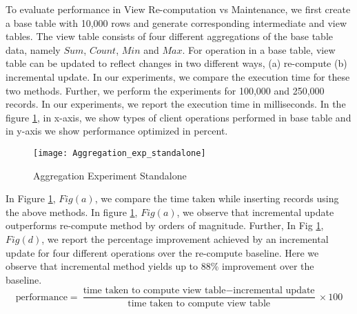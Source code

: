 \documentclass[11pt,a4paper,bibtotoc,idxtotoc,headsepline,footsepline,footexclude,BCOR12mm,DIV13]{scrbook}
\begin{document}
To evaluate performance in View Re-computation vs Maintenance, we first create a base table with 10,000 rows and generate corresponding intermediate and view tables. The view table consists of four different aggregations of the base table data, namely $Sum$, $Count$, $Min$ and $Max$. For operation in a base table, view table can be updated to reflect changes in two different ways, (a) re-compute (b) incremental update. In our experiments, we compare the execution time for these two methods. Further, we perform the experiments for 100,000 and 250,000 records. In our experiments, we report the execution time in milliseconds. In the figure \ref{sec:AggrExpStandalone}, in x-axis, we show types of client operations performed in base table and in y-axis we show performance optimized in percent. 

\begin{figure}
	\centering
	\texttt{[image: Aggregation\_exp\_standalone]}
	\caption{Aggregation Experiment Standalone}
	\label{sec:AggrExpStandalone}
\end{figure} 
\newpage
In Figure \ref{sec:AggrExpStandalone}, $Fig(a)$, we compare the time taken while inserting records using the above methods. In figure \ref{sec:AggrExpStandalone}, $Fig(a)$, we observe that incremental update outperforms re-compute method by orders of magnitude. Further, In Fig \ref{sec:AggrExpStandalone}, $Fig(d)$, we report the percentage improvement achieved by an incremental update for four different operations over the re-compute baseline. Here we observe that incremental method yields up to 88\% improvement over the baseline.
\newline
\begin{equation}
\text{performance} = \frac{\text{time taken to compute view table} - \text{incremental update}}{\text{time taken to compute view table}} \times 100
\end{equation}
	 
\end{document}
